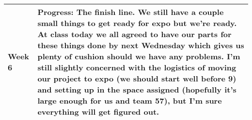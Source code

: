 \documentclass[letterpaper, 10pt, onecolumn, draftclsnofoot]{IEEEtran}
\begin{document}
\begin{center}
\begin{longtable}{|p{4cm}|p{10cm}|}
            \hline
            Week 6 & \textbf{Progress:} The finish line. We still have a couple small things to get ready for expo but we're ready. At class today we all agreed to have our parts for these things done by next Wednesday which gives us plenty of cushion should we have any problems. I'm still slightly concerned with the logistics of moving our project to expo (we should start well before 9) and setting up in the space assigned (hopefully it's large enough for us and team 57), but I'm sure everything will get figured out.\\
            \hline
        \end{longtable}
        \end{center}
        \newpage
\end{document}
